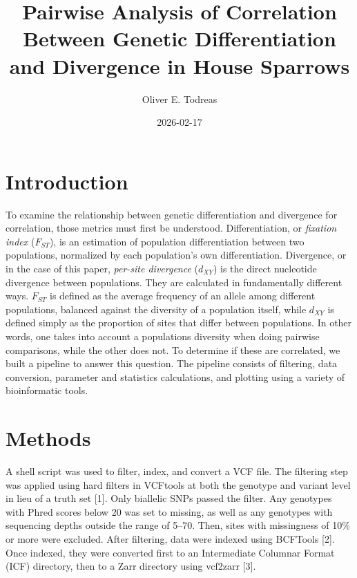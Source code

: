 \documentclass{article}
\begin{document}
\title{Pairwise Analysis of Correlation Between Genetic Differentiation and Divergence in House Sparrows}
\date{2026-02-17}
\author{Oliver E. Todreas}

\maketitle

\newpage

\section{Introduction}

To examine the relationship between genetic differentiation and divergence for correlation, those metrics must first be understood. Differentiation, or \textit{fixation index} ($F_{ST}$), is an estimation of population differentiation between two populations, normalized by each population's own differentiation. Divergence, or in the case of this paper, \textit{per-site divergence} ($d_{XY}$) is the direct nucleotide divergence between populations. They are calculated in fundamentally different ways. $F_{ST}$ is defined as the average frequency of an allele among different populations, balanced against the diversity of a population itself, while $d_{XY}$ is defined simply as the proportion of sites that differ between populations. In other words, one takes into account a populations diversity when doing pairwise comparisons, while the other does not. To determine if these are correlated, we built a pipeline to answer this question. The pipeline consists of filtering, data conversion, parameter and statistics calculations, and plotting using a variety of bioinformatic tools.

\section{Methods}

A shell script was used to filter, index, and convert a VCF file. The filtering step was applied using hard filters in VCFtools at both the genotype and variant level in lieu of a truth set [1]. Only biallelic SNPs passed the filter. Any genotypes with Phred scores below 20 was set to missing, as well as any genotypes with sequencing depths outside the range of 5–70. Then, sites with missingness of 10\% or more were excluded. After filtering, data were indexed using BCFTools [2]. Once indexed, they were converted first to an Intermediate Columnar Format (ICF) directory, then to a Zarr directory using vcf2zarr [3].
\end{document}
